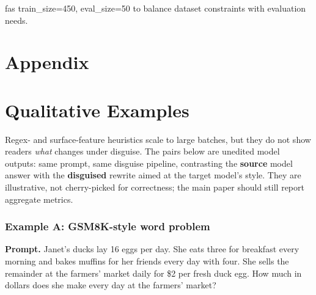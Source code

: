 \documentclass{article}
\begin{document}


ƒas train\_size=450, eval\_size=50 to balance dataset constraints with evaluation needs.

\clearpage




\clearpage
\section*{Appendix} 
\section{Qualitative Examples}

\label{app:qualitative}

\noindent
Regex- and surface-feature heuristics scale to large batches, but they do not show readers \emph{what} changes under disguise.
The pairs below are unedited model outputs: same prompt, same disguise pipeline, contrasting the \textbf{source} model answer with the \textbf{disguised} rewrite aimed at the target model's style.
They are illustrative, not cherry-picked for correctness; the main paper should still report aggregate metrics.

\subsubsection*{Example A: GSM8K-style word problem}
\textbf{Prompt.}
Janet's ducks lay 16 eggs per day. She eats three for breakfast every morning and bakes muffins for her friends every day with four. She sells the remainder at the farmers' market daily for \$2 per fresh duck egg. How much in dollars does she make every day at the farmers' market?
\end{document}
